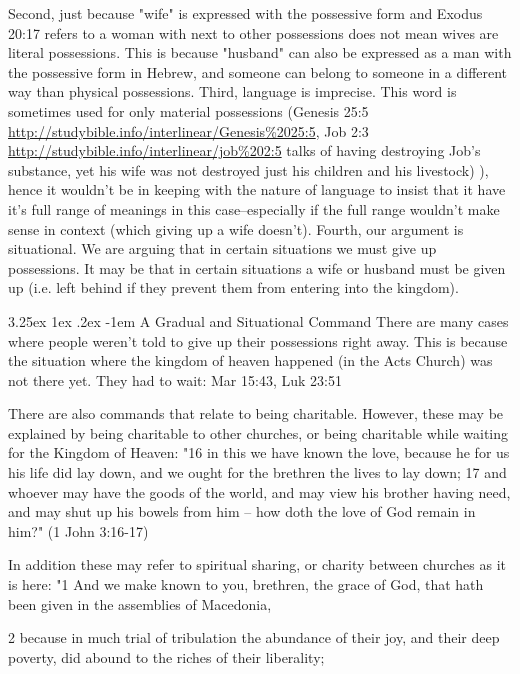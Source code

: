 \documentclass[11pt]{article}
\makeatletter
\renewcommand\paragraph{\@startsection{paragraph}{5}{\z@}%
  {3.25ex \@plus1ex \@minus.2ex}%
  {-1em}%
  {\normalfont\normalsize\bfseries}}
\makeatother
\begin{document}
Second, just because "wife" is expressed with the possessive form and Exodus 20:17 refers to a woman with next to other possessions does not mean wives are literal possessions. This is because "husband" can also be expressed as a man with the possessive form in Hebrew, and someone can belong to someone in a different way than physical possessions. Third, language is imprecise. This word is sometimes used for only material possessions (Genesis 25:5 \url{http://studybible.info/interlinear/Genesis\%2025:5}, Job 2:3 \url{http://studybible.info/interlinear/job\%202:5}
 talks of having destroying Job's substance, yet his wife was not destroyed just his children and his livestock)
 ), hence it wouldn't be in keeping with the nature of language to insist that it have it's full range of meanings in this case--especially if the full range wouldn't make sense in context (which giving up a wife doesn't). Fourth, our argument is situational. We are arguing that in certain situations we must give up possessions. It may be that in certain situations a wife or husband must be given up (i.e. left behind if they prevent them from entering into the kingdom).  

\paragraph{A Gradual and Situational Command}
There are many cases where people weren't told to give up their possessions right away. This is because the situation where the kingdom of heaven happened (in the Acts Church) was not there yet. They had to wait: Mar 15:43, Luk 23:51

There are also commands that relate to being charitable. However, these may be explained by being charitable to other churches, or being charitable while waiting for the Kingdom of Heaven: 
"16 in this we have known the love, because he for us his life did lay down, and we ought for the brethren the lives to lay down; 17 and whoever may have the goods of the world, and may view his brother having need, and may shut up his bowels from him -- how doth the love of God remain in him?" (1 John 3:16-17)

In addition these may refer to spiritual sharing, or charity between churches as it is here:
"1 And we make known to you, brethren, the grace of God, that hath been given in the assemblies of Macedonia,

2 because in much trial of tribulation the abundance of their joy, and their deep poverty, did abound to the riches of their liberality;
\end{document}
